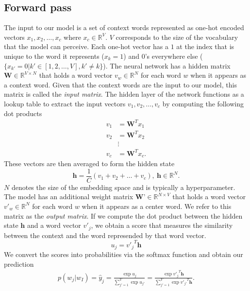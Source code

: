 \documentclass[english]{lni}
\begin{document}
\subsection{Forward pass}
The input to our model is a set of context words represented as one-hot encoded vectors $x_{1}, x_{2},\hdots,x_{c}$ where $x_{c} \in \mathbb{R}^{V}$.
$V$ corresponds to the size of the vocabulary that the model can perceive. 
Each one-hot vector has a $1$ at the index that is unique to the word it represents ($x_{k} = 1$) and $0$'s everywhere else ($\{x_{k'} = 0 | k'\in [1,2,\hdots,V], k' \neq k\}$).
The neural network has a hidden matrix $\textbf{W} \in \mathbb{R}^{V \times N}$ that holds a word vector $v_w \in \mathbb{R}^N$ for each word $w$ when it appears as a context word.
Given that the context words are the input to our model, this matrix is called the \textit{input matrix}. 
The hidden layer of the network functions as a lookup table to extract the input vectors $v_1, v_2,\hdots,v_c$ by computing the following dot products
\begin{align}
    v_1 &= \textbf{W}^{T}x_1 \nonumber \\
    v_2 &= \textbf{W}^{T}x_2 \nonumber \\
        & \vdots                       \\
    v_c &= \textbf{W}^{T}x_c. \nonumber
\end{align}
These vectors are then averaged to form the hidden state 
\begin{equation}
    \label{eq:hidden_state}
    \textbf{h} = \frac{1}{C}(v_1 + v_2 + \hdots + v_c), \:
    \textbf{h} \in \mathbb{R}^{N}.
\end{equation}
$N$ denotes the size of the embedding space and is typically a hyperparameter. 
The model has an additional weight matrix $\textbf{W'} \in \mathbb{R}^{N \times V}$ that holds a word vector $v'_w \in \mathbb{R}^N$ for each word $w$ when it appears 
as a center word. We refer to this matrix as the \textit{output matrix}.
If we compute the dot product between the hidden state $\textbf{h}$ and a word vector $v'_j$,
we obtain a score that measures the similarity between the context and the word represended by that word vector.
\begin{equation}
    u_{j} = {v'_{j}}^{T}\textbf{h}
\end{equation}
We convert the scores into probabilities via the softmax function and obtain our prediction
\begin{align}
    \label{eq:yhat}
    p(w_{j}|w_{I}) = \hat{y}_{j} = \frac{\exp{u_{j}}}{\sum_{j'=1}^{V}{\exp{u_{j'}}}} = \frac{\exp{{v'_{j}}^{T}\textbf{h}}}{\sum_{j'=1}^{V}{\exp{{v'_{j'}}^{T}\textbf{h}}}}. 
\end{align}
\end{document}
